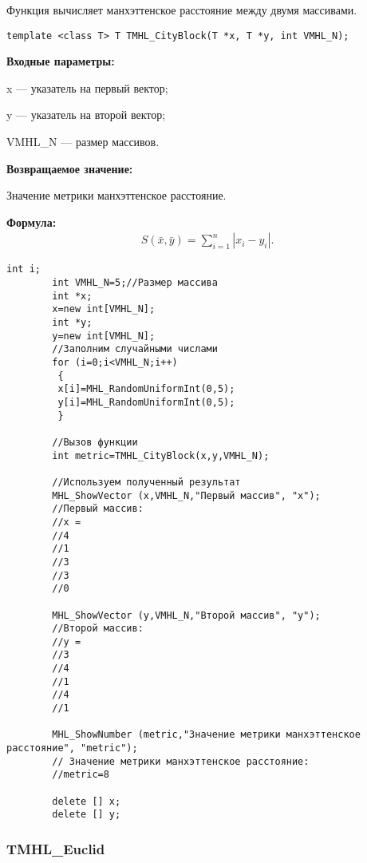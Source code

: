 \documentclass[a4paper,12pt]{article}
\begin{document}
Функция вычисляет манхэттенское расстояние между двумя массивами.


\begin{lstlisting}[label=code_syntax_TMHL_CityBlock,caption=Синтаксис]
template <class T> T TMHL_CityBlock(T *x, T *y, int VMHL_N);
\end{lstlisting}

\textbf{Входные параметры:}
 
x --- указатель на первый вектор;
 
y --- указатель на второй вектор;
 
VMHL\_N --- размер массивов.

\textbf{Возвращаемое значение:}
 
Значение метрики манхэттенское расстояние.

\textbf{Формула:}
\begin{eqnarray*}
S\left( \bar{x}, \bar{y}\right)=\sum_{i=1}^n \left|x_i-y_i \right|  .
\end{eqnarray*}


\begin{lstlisting}[label=code_use_TMHL_CityBlock,caption=Пример использования]
        int i;
        int VMHL_N=5;//Размер массива
        int *x;
        x=new int[VMHL_N];
        int *y;
        y=new int[VMHL_N];
        //Заполним случайными числами
        for (i=0;i<VMHL_N;i++)
         {
         x[i]=MHL_RandomUniformInt(0,5);
         y[i]=MHL_RandomUniformInt(0,5);
         }

        //Вызов функции
        int metric=TMHL_CityBlock(x,y,VMHL_N);

        //Используем полученный результат
        MHL_ShowVector (x,VMHL_N,"Первый массив", "x");
        //Первый массив:
        //x =	 
        //4
        //1
        //3
        //3
        //0

        MHL_ShowVector (y,VMHL_N,"Второй массив", "y");
        //Второй массив:
        //y =	 
        //3
        //4
        //1
        //4
        //1

        MHL_ShowNumber (metric,"Значение метрики манхэттенское расстояние", "metric");
        // Значение метрики манхэттенское расстояние:
        //metric=8

        delete [] x;
        delete [] y;
\end{lstlisting}

\subsubsection{TMHL\_Euclid}\label{TMHL_Euclid}
\end{document}
